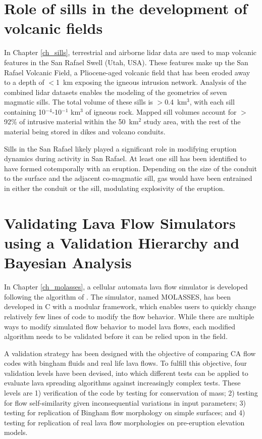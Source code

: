 \section{Role of sills in the development of volcanic fields}
In Chapter \ref{ch_sills}, terrestrial and airborne lidar data are used to map volcanic features in the San Rafael Swell (Utah, USA). These features make up the San Rafael Volcanic Field, a Pliocene-aged volcanic field that has been eroded away to a depth of $<$1~km exposing the igneous intrusion network. Analysis of the combined lidar datasets enables the modeling of the geometries of seven magmatic sills. The total volume of these sills is $>$0.4~km$^3$, with each sill containing 10$^{-4}$-10$^{-1}$ km$^3$ of igneous rock. Mapped sill volumes account for $>$92\% of intrusive material within the 50~km$^2$ study area, with the rest of the material being stored in dikes and volcano conduits.

Sills in the San Rafael likely played a significant role in modifying eruption dynamics during activity in San Rafael. At least one sill has been identified to have formed cotemporally with an eruption. Depending on the size of the conduit to the surface and the adjacent co-magmatic sill, gas would have been entrained in either the conduit or the sill, modulating explosivity of the eruption.

\section{Validating Lava Flow Simulators using a Validation Hierarchy and Bayesian Analysis}
In Chapter \ref{ch_molasses}, a cellular automata \citep{wolfram1984cellular} lava flow simulator is developed following the algorithm of \citet{connor2012probabilistic}. The simulator, named MOLASSES, has been developed in C with a modular framework, which enables users to quickly change relatively few lines of code to modify the flow behavior. While there are multiple ways to modify simulated flow behavior to model lava flows, each modified algorithm needs to be validated before it can be relied upon in the field. 

A validation strategy has been designed with the objective of comparing CA flow codes with bingham fluids and real life lava flows. To fulfill this objective, four validation levels have been devised, into which different tests can be applied to evaluate lava spreading algorithms against increasingly complex tests. These levels are 1) verification of the code by testing for conservation of mass; 2) testing for flow self-similarity given inconsequential variations in input parameters; 3) testing for replication of Bingham flow morphology on simple surfaces; and 4) testing for replication of real lava flow morphologies on pre-eruption elevation models. 


